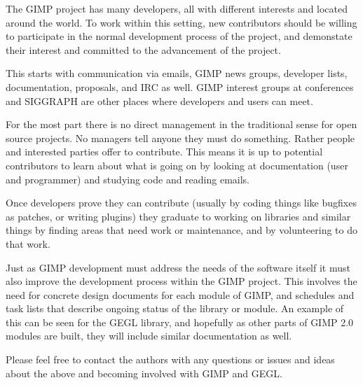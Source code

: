 The GIMP project has many developers, all with different interests and located
around the world. To work within this setting, new contributors should be
willing to participate in the normal development process of the project, and
demonstate their interest and committed to the advancement of the project.  

This starts with communication via emails, GIMP news groups, developer lists,
documentation, proposals, and IRC as well. GIMP interest groups at conferences
and SIGGRAPH are other places where developers and users can meet.  

For the most part there is no direct management in the traditional sense for
open source projects. No managers tell anyone they must do something.  Rather
people and interested parties offer to contribute. This means it is up to
potential contributors to learn about what is going on by looking at
documentation (user and programmer) and studying code and reading emails. 

Once developers prove they can contribute (usually by coding things like
bugfixes as patches, or writing plugins) they graduate to working on libraries
and similar things by finding areas that need work or maintenance, and by
volunteering to do that work.

Just as GIMP development must address the needs of the software itself it must
also improve the development process within the GIMP project. This involves the
need for concrete design documents for each module of GIMP, and schedules and
task lists that describe ongoing status of the library or module. An example of
this can be seen for the GEGL library, and hopefully as other parts of GIMP 2.0
modules are built, they will include similar documentation as well.

Please feel free to contact the authors with any questions or issues and ideas
about the above and becoming involved with GIMP and GEGL.
